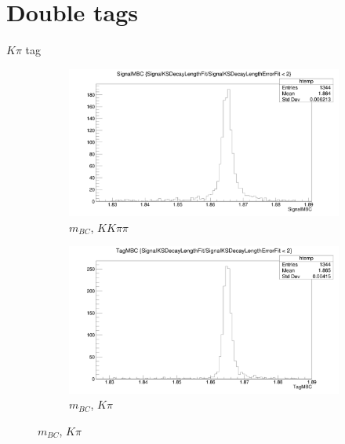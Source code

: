 \documentclass{beamer}
\begin{document}
\section{Double tags}
\begin{frame}{$K\pi$ tag}
  \begin{figure}
    \centering
    \begin{subfigure}{0.5\textwidth}
      \centering
      \includegraphics[width=\textwidth]{KpiDoubleTag_SignalMBC.png}
      \caption{$m_{BC}$, $KK\pi\pi$}
    \end{subfigure}%
    \begin{subfigure}{0.5\textwidth}
      \centering
      \includegraphics[width=\textwidth]{KpiDoubleTag_TagMBC.png}
      \caption{$m_{BC}$, $K\pi$}
    \end{subfigure}
  \end{figure}
\end{frame}
\end{document}
